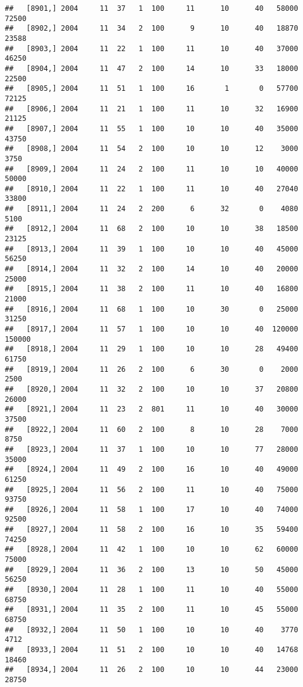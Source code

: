 \documentclass{article}\usepackage[]{graphicx}\usepackage[]{color}
\makeatletter
\newenvironment{kframe}{%
 \def\at@end@of@kframe{}%
 \ifinner\ifhmode%
  \def\at@end@of@kframe{\end{minipage}}%
  \begin{minipage}{\columnwidth}%
 \fi\fi%
 \def\FrameCommand##1{\hskip\@totalleftmargin \hskip-\fboxsep
 \colorbox{shadecolor}{##1}\hskip-\fboxsep
     \hskip-\linewidth \hskip-\@totalleftmargin \hskip\columnwidth}%
 \MakeFramed {\advance\hsize-\width
   \@totalleftmargin\z@ \linewidth\hsize
   \@setminipage}}%
 {\par\unskip\endMakeFramed%
 \at@end@of@kframe}
\newenvironment{knitrout}{}{} %
\makeatother
\begin{document}
\begin{knitrout}
\begin{kframe}
\begin{verbatim}
##   [8901,] 2004     11  37   1  100     11      10      40   58000   72500
##   [8902,] 2004     11  34   2  100      9      10      40   18870   23588
##   [8903,] 2004     11  22   1  100     11      10      40   37000   46250
##   [8904,] 2004     11  47   2  100     14      10      33   18000   22500
##   [8905,] 2004     11  51   1  100     16       1       0   57700   72125
##   [8906,] 2004     11  21   1  100     11      10      32   16900   21125
##   [8907,] 2004     11  55   1  100     10      10      40   35000   43750
##   [8908,] 2004     11  54   2  100     10      10      12    3000    3750
##   [8909,] 2004     11  24   2  100     11      10      10   40000   50000
##   [8910,] 2004     11  22   1  100     11      10      40   27040   33800
##   [8911,] 2004     11  24   2  200      6      32       0    4080    5100
##   [8912,] 2004     11  68   2  100     10      10      38   18500   23125
##   [8913,] 2004     11  39   1  100     10      10      40   45000   56250
##   [8914,] 2004     11  32   2  100     14      10      40   20000   25000
##   [8915,] 2004     11  38   2  100     11      10      40   16800   21000
##   [8916,] 2004     11  68   1  100     10      30       0   25000   31250
##   [8917,] 2004     11  57   1  100     10      10      40  120000  150000
##   [8918,] 2004     11  29   1  100     10      10      28   49400   61750
##   [8919,] 2004     11  26   2  100      6      30       0    2000    2500
##   [8920,] 2004     11  32   2  100     10      10      37   20800   26000
##   [8921,] 2004     11  23   2  801     11      10      40   30000   37500
##   [8922,] 2004     11  60   2  100      8      10      28    7000    8750
##   [8923,] 2004     11  37   1  100     10      10      77   28000   35000
##   [8924,] 2004     11  49   2  100     16      10      40   49000   61250
##   [8925,] 2004     11  56   2  100     11      10      40   75000   93750
##   [8926,] 2004     11  58   1  100     17      10      40   74000   92500
##   [8927,] 2004     11  58   2  100     16      10      35   59400   74250
##   [8928,] 2004     11  42   1  100     10      10      62   60000   75000
##   [8929,] 2004     11  36   2  100     13      10      50   45000   56250
##   [8930,] 2004     11  28   1  100     11      10      40   55000   68750
##   [8931,] 2004     11  35   2  100     11      10      45   55000   68750
##   [8932,] 2004     11  50   1  100     10      10      40    3770    4712
##   [8933,] 2004     11  51   2  100     10      10      40   14768   18460
##   [8934,] 2004     11  26   2  100     10      10      44   23000   28750

\end{verbatim}
\end{kframe}
\end{knitrout}
\end{document}
